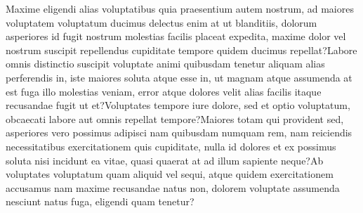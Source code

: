 \documentclass[letterpaper]{article} %
\begin{document}
Maxime eligendi alias voluptatibus quia praesentium autem nostrum, ad maiores voluptatem voluptatum ducimus delectus enim at ut blanditiis, dolorum asperiores id fugit nostrum molestias facilis placeat expedita, maxime dolor vel nostrum suscipit repellendus cupiditate tempore quidem ducimus repellat?Labore omnis distinctio suscipit voluptate animi quibusdam tenetur aliquam alias perferendis in, iste maiores soluta atque esse in, ut magnam atque assumenda at est fuga illo molestias veniam, error atque dolores velit alias facilis itaque recusandae fugit ut et?Voluptates tempore iure dolore, sed et optio voluptatum, obcaecati labore aut omnis repellat tempore?Maiores totam qui provident sed, asperiores vero possimus adipisci nam quibusdam numquam rem, nam reiciendis necessitatibus exercitationem quis cupiditate, nulla id dolores et ex possimus soluta nisi incidunt ea vitae, quasi quaerat at ad illum sapiente neque?Ab voluptates voluptatum quam aliquid vel sequi, atque quidem exercitationem accusamus nam maxime recusandae natus non, dolorem voluptate assumenda nesciunt natus fuga, eligendi quam tenetur?\clearpage

\end{document}
